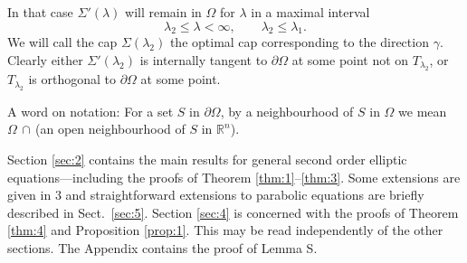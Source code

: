 In that case $\Sigma'(\lambda)$ will remain in $\Omega$ for $\lambda$ in a maximal interval
\[\lambda_2\leq\lambda<\infty,\qquad \lambda_2\leq\lambda_1.\]
We will call the cap $\Sigma(\lambda_2)$ the optimal cap corresponding to the direction $\gamma$. 
Clearly either $\Sigma'(\lambda_2)$ is internally tangent to $\partial\Omega$ 
at some point not on $T_{\lambda_2}$, or $T_{\lambda_2}$ is orthogonal to
$\partial\Omega$ at some point.

A word on notation: For a set $S$ in $\partial\Omega$, by a neighbourhood of $S$ in $\Omega$
we mean $\Omega\,\cap$\,(an open neighbourhood of $S$ in $\mathbb{R}^n$).

Section \ref{sec:2} contains the main results for general second order elliptic equations---including the proofs of Theorem \ref{thm:1}--\ref{thm:3}.
Some extensions are given in 3 and straightforward extensions to 
parabolic equations are briefly described in Sect.~\ref{sec:5}. 
Section \ref{sec:4} is concerned with the proofs of Theorem \ref{thm:4}
and Proposition \ref{prop:1}.
This may be read independently of the other sections.
The Appendix contains the proof of Lemma S.
